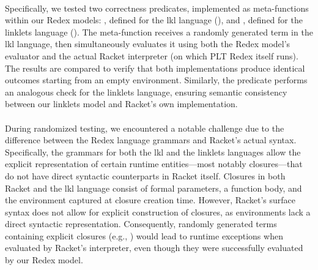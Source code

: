 			\paragraph{}%
				Specifically, we tested two correctness predicates, implemented as meta-functions within our Redex models: , defined for the \gls{lkl} language (), and , defined for the linklets language (). The meta-function  receives a randomly generated term in the \gls{lkl} language, then simultaneously evaluates it using both the Redex model's evaluator and the actual Racket interpreter (on which PLT Redex itself runs). The results are compared to verify that both implementations produce identical outcomes starting from an empty environment. Similarly, the  predicate performs an analogous check for the linklets language, ensuring semantic consistency between our linklets model and Racket’s own implementation.

			\paragraph{}%
				During randomized testing, we encountered a notable challenge due to the difference between the Redex language grammars and Racket's actual syntax. Specifically, the grammars for both the \gls{lkl} and the linklets languages allow the explicit representation of certain runtime entities—most notably closures—that do not have direct syntactic counterparts in Racket itself. Closures in both Racket and the \gls{lkl} language consist of formal parameters, a function body, and the environment captured at closure creation time. However, Racket’s surface syntax does not allow for explicit construction of closures, as environments lack a direct syntactic representation. Consequently, randomly generated terms containing explicit closures (e.g., ) would lead to runtime exceptions when evaluated by Racket’s interpreter, even though they were successfully evaluated by our Redex model.


